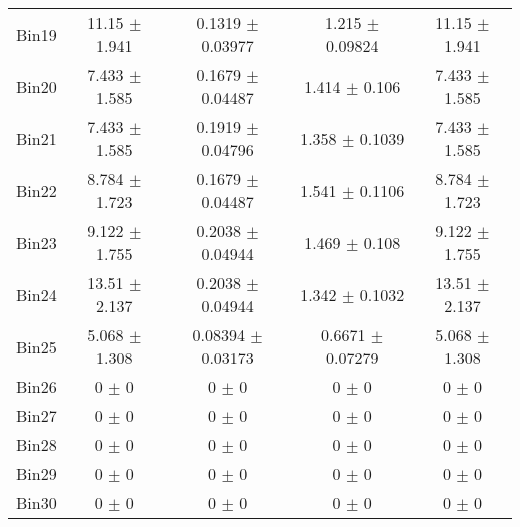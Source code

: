 \begin{tabular}{@{\extracolsep{4pt}}lcccc@{}}
     Bin19 & 11.15 $\pm$ 1.941 & 0.1319 $\pm$ 0.03977 & 1.215 $\pm$ 0.09824 & 11.15 $\pm$ 1.941 \\ 
     Bin20 & 7.433 $\pm$ 1.585 & 0.1679 $\pm$ 0.04487 & 1.414 $\pm$ 0.106 & 7.433 $\pm$ 1.585 \\ 
     Bin21 & 7.433 $\pm$ 1.585 & 0.1919 $\pm$ 0.04796 & 1.358 $\pm$ 0.1039 & 7.433 $\pm$ 1.585 \\ 
     Bin22 & 8.784 $\pm$ 1.723 & 0.1679 $\pm$ 0.04487 & 1.541 $\pm$ 0.1106 & 8.784 $\pm$ 1.723 \\ 
     Bin23 & 9.122 $\pm$ 1.755 & 0.2038 $\pm$ 0.04944 & 1.469 $\pm$ 0.108 & 9.122 $\pm$ 1.755 \\ 
     Bin24 & 13.51 $\pm$ 2.137 & 0.2038 $\pm$ 0.04944 & 1.342 $\pm$ 0.1032 & 13.51 $\pm$ 2.137 \\ 
     Bin25 & 5.068 $\pm$ 1.308 & 0.08394 $\pm$ 0.03173 & 0.6671 $\pm$ 0.07279 & 5.068 $\pm$ 1.308 \\ 
     Bin26 & 0 $\pm$ 0 & 0 $\pm$ 0 & 0 $\pm$ 0 & 0 $\pm$ 0 \\ 
     Bin27 & 0 $\pm$ 0 & 0 $\pm$ 0 & 0 $\pm$ 0 & 0 $\pm$ 0 \\ 
     Bin28 & 0 $\pm$ 0 & 0 $\pm$ 0 & 0 $\pm$ 0 & 0 $\pm$ 0 \\ 
     Bin29 & 0 $\pm$ 0 & 0 $\pm$ 0 & 0 $\pm$ 0 & 0 $\pm$ 0 \\ 
     Bin30 & 0 $\pm$ 0 & 0 $\pm$ 0 & 0 $\pm$ 0 & 0 $\pm$ 0 \\ 
\hline\hline
  \end{tabular}
